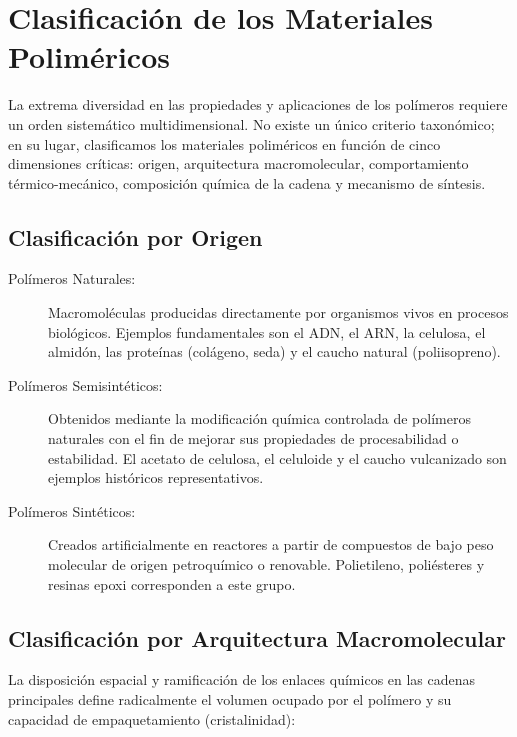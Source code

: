 \chapter{Clasificación de los Materiales Poliméricos}
\label{cap:clasificacion}

La extrema diversidad en las propiedades y aplicaciones de los polímeros requiere un orden sistemático multidimensional. No existe un único criterio taxonómico; en su lugar, clasificamos los materiales poliméricos en función de cinco dimensiones críticas: origen, arquitectura macromolecular, comportamiento térmico-mecánico, composición química de la cadena y mecanismo de síntesis.

\section{Clasificación por Origen}

\begin{description}
    \item[Polímeros Naturales:] Macromoléculas producidas directamente por organismos vivos en procesos biológicos. Ejemplos fundamentales son el ADN, el ARN, la celulosa, el almidón, las proteínas (colágeno, seda) y el caucho natural (poliisopreno).
    \item[Polímeros Semisintéticos:] Obtenidos mediante la modificación química controlada de polímeros naturales con el fin de mejorar sus propiedades de procesabilidad o estabilidad. El acetato de celulosa, el celuloide y el caucho vulcanizado son ejemplos históricos representativos.
    \item[Polímeros Sintéticos:] Creados artificialmente en reactores a partir de compuestos de bajo peso molecular de origen petroquímico o renovable. Polietileno, poliésteres y resinas epoxi corresponden a este grupo.
\end{description}

\section{Clasificación por Arquitectura Macromolecular}

La disposición espacial y ramificación de los enlaces químicos en las cadenas principales define radicalmente el volumen ocupado por el polímero y su capacidad de empaquetamiento (cristalinidad):

